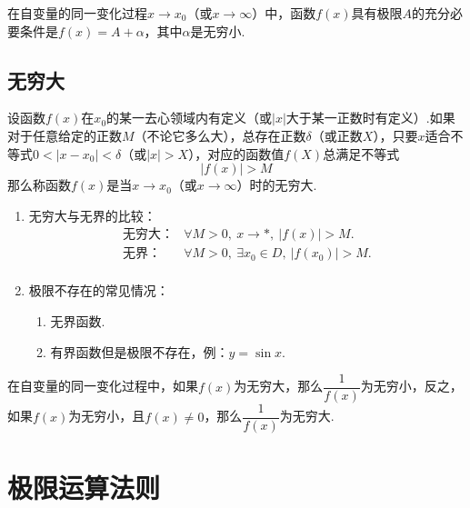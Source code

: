 \begin{theorem}
	在自变量的同一变化过程\( x \to x_{0} \)（或\( x \to \infty \)）中，函数\( f(x) \)具有极限\( A \)的{\heiti 充分必要条件}是\( f(x) = A + \alpha \)，其中\( \alpha \)是无穷小.
\end{theorem}

\subsection{无穷大}

\begin{definition}[无穷大]
	设函数\( f(x) \)在\( x_{0} \)的某一去心领域内有定义（或\( |x| \)大于某一正数时有定义）.如果对于任意给定的正数\( M \)（不论它多么大），总存在正数\( \delta \)（或正数\( X \)），只要\( x \)适合不等式\( 0 < | x - x_{0} | < \delta \)（或\( |x| > X \)），对应的函数值\( f(X) \)总满足不等式
	\[ | f(x) | > M \]
	那么称函数\( f(x) \)是当\( x \to x_{0} \)（或\( x \to \infty \)）时的无穷大.
\end{definition}

\begin{note}
	\begin{enumerate}
		\item 无穷大与无界的比较：
		\[ \begin{array}{ll}
			\text{无穷大：} & \forall M > 0,\ x \to *,\ |f(x)| > M. \\
			\text{无界：}   & \forall M > 0,\ \exists x_{0} \in D,\ |f(x_{0})| > M. \\
		\end{array} \]
		\item 极限不存在的常见情况：
		\begin{enumerate}
			\item 无界函数.
			\item 有界函数但是极限不存在，例：\( y = \sin x \).
		\end{enumerate}
	\end{enumerate}
\end{note}

\begin{theorem}
	在自变量的同一变化过程中，如果\( f(x) \)为无穷大，那么\( \dfrac{1}{f(x)} \)为无穷小，反之，如果\( f(x) \)为无穷小，且\( f(x) \neq 0 \)，那么\( \dfrac{1}{f(x)} \)为无穷大.
\end{theorem}

\section{极限运算法则}

